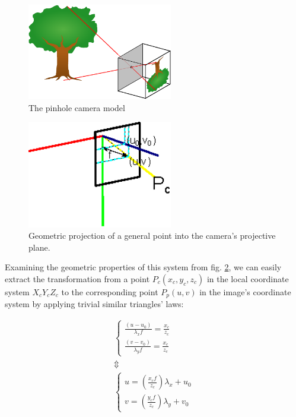 \begin{figure}[htbp]
\centering
\includegraphics[width=2.5in]{./Graphics/pinhole_camera}
\caption{The pinhole camera model \label{fig:pinhole_camera}}
\end{figure}
\begin{figure}[htbp]
\centering
\includegraphics[width=2.5in]{./Graphics/camera_intrinsics}
\caption{Geometric projection of a general point into the camera's projective
plane. \label{fig:intrinsics}}
\end{figure}
Examining the geometric properties of this system from fig. \ref{fig:intrinsics}, we can easily extract the
transformation from a point $P_c(x_c,y_c,z_c)$ in the local coordinate system
$X_cY_cZ_c$ to the corresponding point $P_p(u,v)$ in the image's coordinate
system by applying trivial similar triangles' laws:

\[
  \begin{array}{c}
    \left\{\begin{array}{c}
    \frac{(u-u_0)}{\lambda _x f}=\frac{x_c}{z_c} \\
    \frac{(v-v_0)}{\lambda _y f}=\frac{x_c}{z_c}
  \end{array}
  \right. \\
  \Updownarrow \\
  \left\{\begin{array}{c}
      u=\left(\frac{x_c f}{z_c}\right) \lambda _x+u_0 \\
      v=\left(\frac{y_c f}{z_c}\right) \lambda _y+v_0
    \end{array}
    \right. 
  \end{array}
\]

